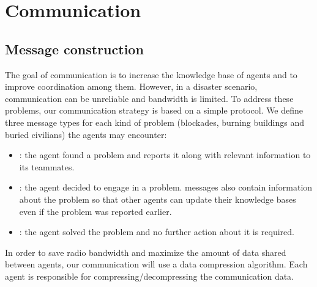 \section{Communication}
\label{sec:communication}

\subsection{Message construction}
The goal of communication is to increase the knowledge base of agents and to improve coordination among them. However, in a disaster scenario, communication can be unreliable and bandwidth is limited. To address these problems, our communication strategy is based on a simple protocol. We define three message types for each kind of problem (blockades, burning buildings and buried civilians) the agents may encounter:

\begin{itemize}
 \item {}: the agent found a problem and reports it along with relevant information to its teammates. %

 \item {}: the agent decided to engage in a problem.  messages also contain information about the problem so that other agents can update their knowledge bases even if the problem was reported earlier.

 \item {}: the agent solved the problem and no further action about it is required. %
\end{itemize}


In order to save radio bandwidth and maximize the amount of data shared between agents, our communication will use a data compression algorithm. Each agent is responsible for compressing/decompressing the communication data.

